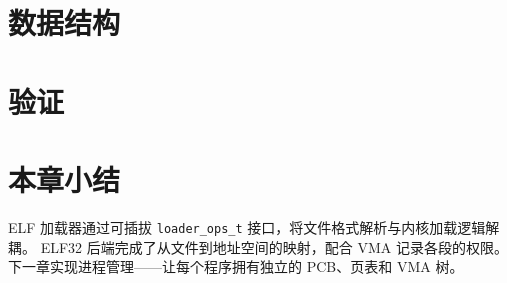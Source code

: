 \section{数据结构}
\label{sec:elf-structs}


\section{验证}
\label{sec:elf-verify}


\section{本章小结}

ELF 加载器通过可插拔 \texttt{loader\_ops\_t} 接口，将文件格式解析与内核加载逻辑解耦。
ELF32 后端完成了从文件到地址空间的映射，配合 VMA 记录各段的权限。
下一章实现进程管理——让每个程序拥有独立的 PCB、页表和 VMA 树。
